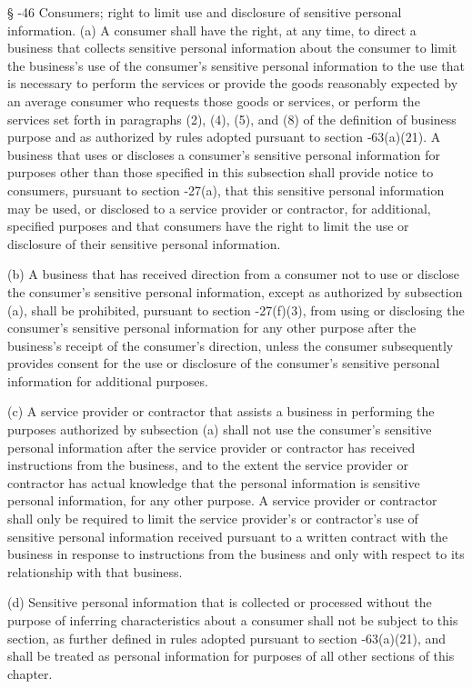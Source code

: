      §   -46  Consumers; right to limit use and disclosure of sensitive personal information.  (a)  A consumer shall have the right, at any time, to direct a business that collects sensitive personal information about the consumer to limit the business's use of the consumer's sensitive personal information to the use that is necessary to perform the services or provide the goods reasonably expected by an average consumer who requests those goods or services, or perform the services set forth in paragraphs (2), (4), (5), and (8) of the definition of business purpose and as authorized by rules adopted pursuant to section    ‑63(a)(21).  A business that uses or discloses a consumer's sensitive personal information for purposes other than those specified in this subsection shall provide notice to consumers, pursuant to section    -27(a), that this sensitive personal information may be used, or disclosed to a service provider or contractor, for additional, specified purposes and that consumers have the right to limit the use or disclosure of their sensitive personal information.

     (b)  A business that has received direction from a consumer not to use or disclose the consumer's sensitive personal information, except as authorized by subsection (a), shall be prohibited, pursuant to section    -27(f)(3), from using or disclosing the consumer's sensitive personal information for any other purpose after the business's receipt of the consumer's direction, unless the consumer subsequently provides consent for the use or disclosure of the consumer's sensitive personal information for additional purposes.

     (c)  A service provider or contractor that assists a business in performing the purposes authorized by subsection (a) shall not use the consumer's sensitive personal information after the service provider or contractor has received instructions from the business, and to the extent the service provider or contractor has actual knowledge that the personal information is sensitive personal information, for any other purpose.  A service provider or contractor shall only be required to limit the service provider's or contractor's use of sensitive personal information received pursuant to a written contract with the business in response to instructions from the business and only with respect to its relationship with that business.

     (d)  Sensitive personal information that is collected or processed without the purpose of inferring characteristics about a consumer shall not be subject to this section, as further defined in rules adopted pursuant to section    -63(a)(21), and shall be treated as personal information for purposes of all other sections of this chapter.

